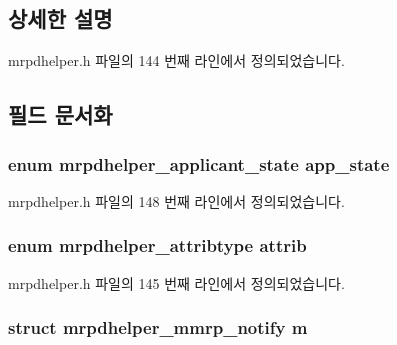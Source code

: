 \subsection{상세한 설명}


mrpdhelper.\+h 파일의 144 번째 라인에서 정의되었습니다.



\subsection{필드 문서화}
\subsubsection[{\texorpdfstring{app\+\_\+state}{app_state}}]{\setlength{\rightskip}{0pt plus 5cm}enum {\bf mrpdhelper\+\_\+applicant\+\_\+state} app\+\_\+state}\hypertarget{structmrpdhelper__notify_a35bac155de3294018f4a40e52c9ae0c5}{}\label{structmrpdhelper__notify_a35bac155de3294018f4a40e52c9ae0c5}


mrpdhelper.\+h 파일의 148 번째 라인에서 정의되었습니다.

\subsubsection[{\texorpdfstring{attrib}{attrib}}]{\setlength{\rightskip}{0pt plus 5cm}enum {\bf mrpdhelper\+\_\+attribtype} attrib}\hypertarget{structmrpdhelper__notify_a8bdec45795e4be55851ca7772648a776}{}\label{structmrpdhelper__notify_a8bdec45795e4be55851ca7772648a776}


mrpdhelper.\+h 파일의 145 번째 라인에서 정의되었습니다.

\subsubsection[{\texorpdfstring{m}{m}}]{\setlength{\rightskip}{0pt plus 5cm}struct {\bf mrpdhelper\+\_\+mmrp\+\_\+notify} m}\hypertarget{structmrpdhelper__notify_a519933d54b2802a4e411e6f33f075e8e}{}\label{structmrpdhelper__notify_a519933d54b2802a4e411e6f33f075e8e}


